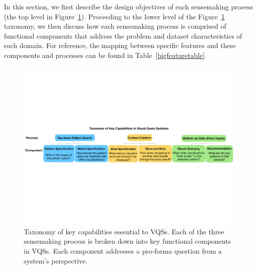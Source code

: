 \par In this section, we first describe the design objectives of each sensemaking process (the top level in Figure~\ref{fig:taxonomy}). Proceeding to the lower level of the Figure~\ref{fig:taxonomy} taxonomy, we then discuss how each sensemaking process is comprised of functional components that address the problem and dataset characteristics of each domain. For reference, the mapping between specific \zvpp features and these components and processes can be found in Table~\ref{bigfeaturetable}.
    \begin{figure}[ht!]
    \centering
    \includegraphics[width=0.9\linewidth]{figures/taxonomy.pdf}
    \caption{Taxonomy of key capabilities essential to VQSs. Each of the three sensemaking process is broken down into key functional components in VQSs. Each component addresses a pro-forma question from a system's perspective.} %
    \label{fig:taxonomy}
    \vspace*{-10pt}
    \end{figure}
